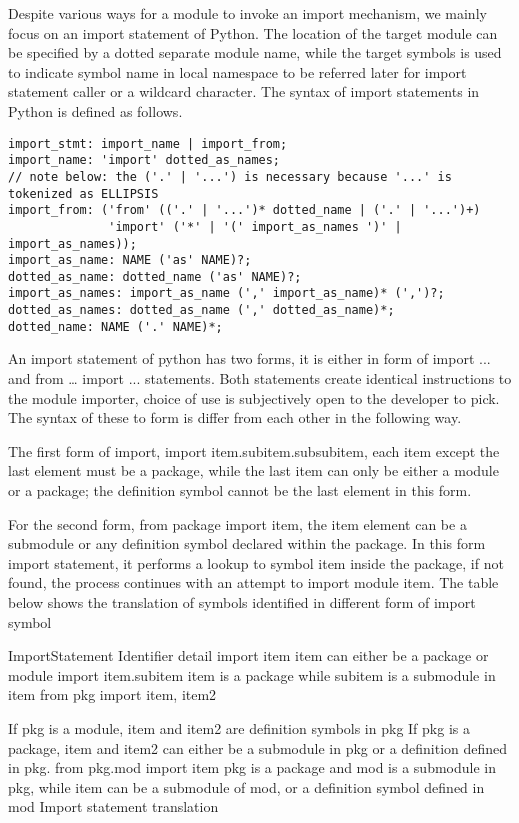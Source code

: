 Despite various ways for a module to invoke an import mechanism, we mainly focus on an import statement of Python. The location of the target module can be specified by a dotted separate module name, while the target symbols is used to indicate symbol name in local namespace to be referred later for import statement caller or a wildcard character. The syntax of import statements in Python is defined as follows.


\begin{lstlisting}[style=ANTLR ,float, caption={Import statement syntax for python 3},captionpos=b]
import_stmt: import_name | import_from;
import_name: 'import' dotted_as_names;
// note below: the ('.' | '...') is necessary because '...' is tokenized as ELLIPSIS
import_from: ('from' (('.' | '...')* dotted_name | ('.' | '...')+)
              'import' ('*' | '(' import_as_names ')' | import_as_names));
import_as_name: NAME ('as' NAME)?;
dotted_as_name: dotted_name ('as' NAME)?;
import_as_names: import_as_name (',' import_as_name)* (',')?;
dotted_as_names: dotted_as_name (',' dotted_as_name)*;
dotted_name: NAME ('.' NAME)*;
\end{lstlisting}

An import statement of python has two forms, it is either in form of import ... and from … import ... statements. Both statements create identical instructions to the module importer, choice of use is subjectively open to the developer to pick. The syntax of these to form is differ from each other in the following way.

The first form of import, import item.subitem.subsubitem, each item except the last element must be a package, while the last item can only be either a module or a package; the definition symbol cannot be the last element in this form.

For the second form, from package import item, the item element can be a submodule or any definition symbol declared within the package. In this form import statement, it performs a lookup to symbol item inside the package, if not found, the process continues with an attempt to import module item. The table below shows the translation of symbols identified in different form of import symbol


ImportStatement
Identifier detail
import item
item can either be a package or module
import item.subitem
item is a package while subitem is a submodule in item
from pkg import item, item2



If pkg is a module, item and item2 are definition symbols in pkg
If pkg is a package, item and item2 can either be a submodule in pkg or a definition defined in pkg.
from pkg.mod import item
pkg is a package and mod is a submodule in pkg, while item can be a submodule of mod, or a definition symbol defined in mod
Import statement translation

